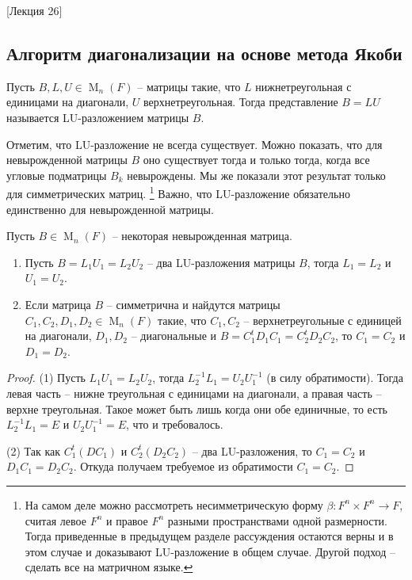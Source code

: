 [Лекция 26]


\subsection{Алгоритм диагонализации на основе метода Якоби}
\label{subsection::JacobyAlg}

\begin{definition}
Пусть $B, L, U\in\operatorname{M}_n(F)$ -- матрицы такие, что $L$ нижнетреугольная с единицами на диагонали, $U$ верхнетреугольная.
Тогда представление $B = LU$ называется LU-разложением матрицы $B$.
\end{definition}

Отметим, что LU-разложение не всегда существует.
Можно показать, что для невырожденной матрицы $B$ оно существует тогда и только тогда, когда все угловые подматрицы $B_k$ невырождены.
Мы же показали этот результат только для симметрических матриц.%
\footnote{На самом деле можно рассмотреть несимметрическую форму $\beta\colon F^n\times F^n \to F$, считая левое $F^n$ и правое $F^n$ разными пространствами одной размерности.
Тогда приведенные в предыдущем разделе рассуждения остаются верны и в этом случае и доказывают LU-разложение в общем случае.
Другой подход -- сделать все на матричном языке.}
Важно, что LU-разложение обязательно единственно для невырожденной матрицы.

\begin{claim}
Пусть $B\in \operatorname{M}_n(F)$ -- некоторая невырожденная матрица.
\begin{enumerate}
\item Пусть $B = L_1 U_1 = L_2 U_2$ -- два LU-разложения матрицы $B$, тогда $L_1 = L_2$ и $U_1 = U_2$.

\item Если матрица $B$ -- симметрична и найдутся матрицы $C_1,C_2, D_1,D_2\in\operatorname{M}_n(F)$ такие, что $C_1, C_2$ -- верхнетреугольные с единицей на диагонали, $D_1, D_2$ -- диагональные и $B = C_1^t D_1 C_1 = C_2^t D_2 C_2$, то $C_1 = C_2$ и $D_1 = D_2$.
\end{enumerate}
\end{claim}
\begin{proof}
(1) Пусть $L_1 U_1 = L_2 U_2$, тогда $L_2^{-1}L_1 = U_2 U_1^{-1}$ (в силу обратимости).
Тогда левая часть -- нижне треугольная с единицами на диагонали, а правая часть -- верхне треугольная.
Такое может быть лишь когда они обе единичные, то есть $L_2^{-1} L_1 = E$ и $U_2 U_1^{-1} = E$, что и требовалось.

(2) Так как $C_1^t(DC_1)$ и $C_2^t(D_2 C_2)$ -- два LU-разложения, то $C_1 = C_2$ и $D_1C_1 = D_2C_2$.
Откуда получаем требуемое из обратимости $C_1 = C_2$.
\end{proof}

